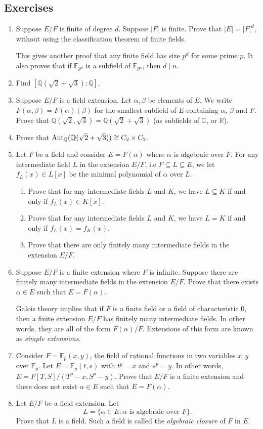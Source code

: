 \documentclass{article}
\def\Aut{{\rm Aut}}
\def\R{{\mathbb R}}
\def\F{{\mathbb F}}
\def\Q{{\mathbb Q}}
\def\F{{\mathbb F}}
\def\Q{{\mathbb Q}}
\def\C{{\mathbb C}}
\begin{document}
\subsection*{Exercises}
\begin{enumerate}[\thesection .1]
    \item Suppose $E/F$ is finite of degree $d$. Suppose $|F|$ is finite. Prove that $|E| = |F|^d$, without using the classification theorem of finite fields. 
    
    This gives another proof that any finite field has size $p^d$ for some prime $p$. It also proves that if $\F_{p^d}$ is a subfield of $\F_{p^n}$, then $d\mid n$.
    \item Find $[\Q(\sqrt{2} + \sqrt{3}):\Q]$. 
    \item Suppose $E/F$ is a field extension. Let $\alpha,\beta$ be elements of $E$. We write $F(\alpha,\beta) = F(\alpha)(\beta)$ for the smallest subfield of $E$ containing $\alpha$, $\beta$ and $F$. Prove that $\Q(\sqrt{2}, \sqrt{3}) = \Q(\sqrt{2}+\sqrt{3})$ (as subfields of $\C$, or $\R$).
    \item Prove that $\Aut_\Q(\Q(\sqrt{2}+\sqrt{3})) \cong C_2\times C_2$.
    \item Let $F$ be a field and consider $E = F(\alpha)$ where $\alpha$ is algebraic over $F$. For any intermediate field $L$  in the extension $E/F$, i.e $F\subseteq L\subseteq E$, we let $f_L(x)\in L[x]$ be the minimal polynomial of $\alpha$ over $L$.
    \begin{enumerate}
        \item Prove that for any intermediate fields $L$ and $K$, we have $L\subseteq K$ if and only if $f_L(x) \in K[x]$.
        \item Prove that for any intermediate fields $L$ and $K$, we have $L= K$ if and only if $f_L(x) = f_K(x)$.
        \item Prove that there are only finitely many intermediate fields in the extension $E/F$.
    \end{enumerate}
    \item Suppose $E/F$ is a finite extension where $F$ is infinite. Suppose there are finitely many intermediate fields in the extension $E/F$. Prove that there exists $\alpha\in E$ such that $E = F(\alpha)$.

    Galois theory implies that if $F$ is a finite field or a field of characteristic $0$, then a finite extension $E/F$ has finitely many intermediate fields. In other words, they are all of the form $F(\alpha)/F$. Extensions of this form are known as \textit{simple extensions}.
    \item Consider $F = \F_p(x,y)$, the field of rational functions in two variables $x,y$ over $\F_p$. Let $E = \F_p(t,s)$ with $t^p = x$ and $s^p = y$. In other words, $E = F[T,S]/(T^p - x, S^p - y).$ Prove that $E/F$ is a finite extension and there does not exist $\alpha\in E$ such that $E = F(\alpha)$.
    \item Let $E/F$ be a field extension. Let $$L=\{\alpha\in E\colon \alpha\mbox{ is algebraic over }F\}.$$
    Prove that $L$ is a field. Such a field is called the \textit{algebraic closure} of $F$ in $E$. 
\end{enumerate}
\end{document}
